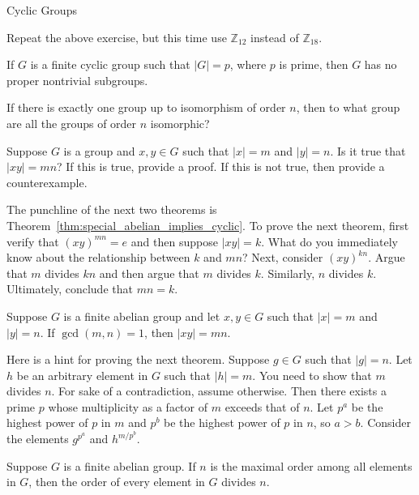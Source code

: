 \begin{section}{Cyclic Groups}
\begin{problem}
Repeat the above exercise, but this time use $\mathbb{Z}_{12}$ instead of $\mathbb{Z}_{18}$.
\end{problem}

\begin{corollary}
If $G$ is a finite cyclic group such that $|G|=p$, where $p$ is prime, then $G$ has no proper nontrivial subgroups.
\end{corollary}

\begin{problem}
If there is exactly one group up to isomorphism of order $n$, then to what group are all the groups of order $n$ isomorphic?
\end{problem}

\begin{problem}
Suppose $G$ is a group and $x,y\in G$ such that $|x|=m$ and $|y|=n$. Is it true that $|xy|=mn$?  If this is true, provide a proof.  If this is not true, then provide a counterexample.
\end{problem}

The punchline of the next two theorems is Theorem~\ref{thm:special_abelian_implies_cyclic}. To prove the next theorem,  first verify that $(xy)^{mn}=e$ and then suppose $|xy|=k$. What do you immediately know about the relationship between $k$ and $mn$? Next, consider $(xy)^{kn}$. Argue that $m$ divides $kn$ and then argue that $m$ divides $k$. Similarly, $n$ divides $k$. Ultimately, conclude that $mn=k$.

\begin{theorem}
Suppose $G$ is a finite abelian group and let $x,y\in G$ such that $|x|=m$ and $|y|=n$. If $\gcd(m,n)=1$, then $|xy|=mn$.
\end{theorem}

Here is a hint for proving the next theorem. Suppose $g\in G$ such that $|g|=n$. Let $h$ be an arbitrary element in $G$ such that $|h|=m$. You need to show that $m$ divides $n$. For sake of a contradiction, assume otherwise. Then there exists a prime $p$ whose multiplicity as a factor of $m$ exceeds that of $n$. Let $p^a$ be the highest power of $p$ in $m$ and $p^b$ be the highest power of $p$ in $n$, so $a>b$. Consider the elements $g^{p^a}$ and $h^{m/p^b}$.

\begin{theorem}
Suppose $G$ is a finite abelian group. If $n$ is the maximal order among all elements in $G$, then the order of every element in $G$ divides $n$.
\end{theorem}


\end{section}
